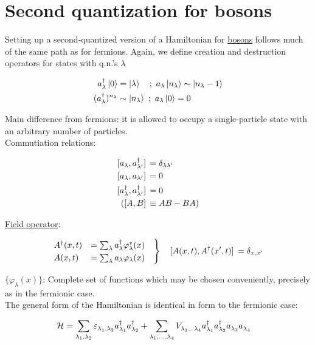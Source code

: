 \section{Second quantization for bosons}

Setting up a second-quantized version of a Hamiltonian for \underline{bosons} follows much of the same path as for fermions. Again, we define creation and destruction operators for states with q.n.'s $\lambda$

\begin{align}
    a_\lambda^\dagger \ket{0} &= \ket{\lambda} \quad ; \ a_\lambda\ket{n_\lambda} \sim \ket{n_\lambda - 1} \\
    (a_\lambda^\dagger)^{n_\lambda} &\sim \ket{n_\lambda} \ ; \ a_\lambda\ket{0} = 0
\end{align}

Main difference from fermions: it is allowed to occupy a single-particle state with an arbitrary number of particles. \\  Commutiation relations:

\begin{align}
    \comm*{a_\lambda}{a_{\lambda'}^\dagger} &= \delta_{\lambda \lambda'} \\
    \comm*\Big{a_\lambda}{a_{\lambda'}} &= 0 \\
    \comm*{a_\lambda^\dagger}{a_{\lambda'}^\dagger} &= 0 \\ 
    (\comm*{A}{B} &\equiv AB - BA)
\end{align}

 \uline{Field operator}:

\begin{align}
    \begin{rcases}
    A^\dagger (x, t) &= \sum_\lambda a_\lambda^\dagger \varphi_\lambda^*(x) \quad \\
    A(x, t) &= \sum_\lambda a_\lambda \varphi_\lambda(x)
    \end{rcases}
    \quad
    \comm*{A(x,t)}{A^\dagger (x', t)} = \delta_{x, x'}
\end{align}

 $\{\varphi_\lambda(x)\}$: Complete set of functions which may be chosen conveniently, precisely as in the fermionic case. \\

 The general form of the Hamiltonian is identical in form to the fermionic case:

\begin{tcolorbox}
    \begin{align}
        \mathcal{H} &= \sum_{\lambda_1, \lambda_2} \varepsilon_{\lambda_1, \lambda_2}^{} a_{\lambda_1}^\dagger a_{\lambda_2}^\dagger
        + \sum_{\lambda_1, ..., \lambda_4}V_{\lambda_1 ... \lambda_4}^{}a_{\lambda_1}^\dagger a_{\lambda_2}^\dagger a_{\lambda_3}^{} a_{\lambda_4}^{}
    \end{align}
\end{tcolorbox}

